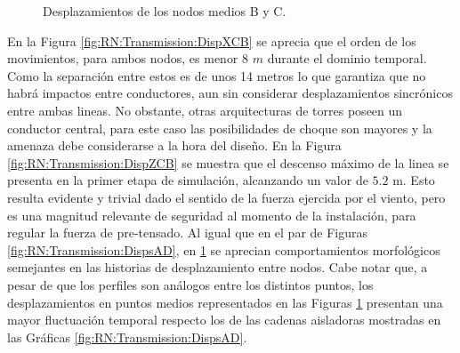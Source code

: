 \begingroup
\centering
\begin{figure}[htbp]
	\centering
	\caption{Desplazamientos de los nodos medios B y C. \label{fig:RN:Transmission:DispsCB}}
\end{figure}
\endgroup

En la Figura \ref{fig:RN:Transmission:DispXCB} se aprecia que el orden de los movimientos, para ambos nodos, es menor 8 $m$ durante el dominio temporal. Como la separación entre estos es de unos 14 metros lo que garantiza que no habrá impactos entre conductores, aun sin considerar desplazamientos sincrónicos entre ambas lineas. No obstante, otras arquitecturas de torres poseen un conductor central, para este caso las posibilidades de choque son mayores y la amenaza debe considerarse a la hora del diseño. En la Figura \ref{fig:RN:Transmission:DispZCB} se muestra que el descenso máximo de la linea se presenta en la primer etapa de simulación, alcanzando un valor de $5.2$ m. Esto resulta evidente y trivial dado el sentido de la fuerza ejercida por el viento, pero es una magnitud relevante de seguridad al momento de la instalación, para regular la fuerza de pre-tensado. Al igual que en el par de Figuras \ref{fig:RN:Transmission:DispsAD}, en \ref{fig:RN:Transmission:DispsCB} se aprecian comportamientos morfológicos semejantes en las historias de desplazamiento entre nodos. Cabe notar que, a pesar de que los perfiles son análogos entre los distintos puntos, los desplazamientos en puntos medios representados en las Figuras \ref{fig:RN:Transmission:DispsCB} presentan una mayor fluctuación temporal respecto los de las cadenas aisladoras mostradas en las Gráficas \ref{fig:RN:Transmission:DispsAD}.

